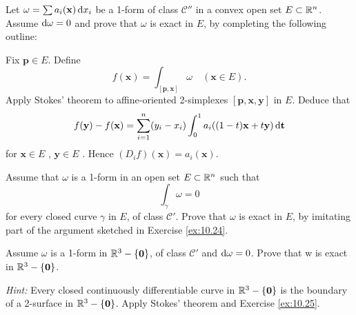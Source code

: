 \begin{myexercise}
    \label{ex:10.24}
    Let $\omega = \sum a_i(\mathbf{x}) \d x_i$ be a 1-form of class $\mathscr{C}''$ in a convex open set $E \subset {\protect\mathbb R}^n$.
    Assume $\d \omega = 0$ and prove that $\omega$ is exact in $E$, by completing the following outline:

    Fix $\mathbf{p} \in E$. 
    Define 
    \begin{equation*}
        f(\mathbf{x}) = \int_{[\mathbf{p,x}]} \omega 
        \quad 
        (\mathbf{x} \in E).
    \end{equation*}
    Apply Stokes' theorem to affine-oriented 2-simplexes $[\mathbf{p, x, y}]$ in $E$. 
    Deduce that
    \begin{equation*}
        f(\mathbf{y}) -
        f(\mathbf{x}) =
        \sum_{i=1}^{n} (y_i-x_i)
        \int_{0}^{1} a_i ((1-t)\mathbf{x}+t\mathbf{y}) \d \mathbf{t}
    \end{equation*}
    for 
    $\mathbf{x} \in E$ ,
    $\mathbf{y} \in E$ .
    Hence $(D_i f)(\mathbf{x}) = a_i(\mathbf{x})$.
\end{myexercise}


\begin{myexercise}    
    \label{ex:10.25}
    Assume that $\omega$ is a 1-form in an open set $E \subset {\protect\mathbb R}^n$ such that
    \begin{equation*}
        \int_{\gamma} \omega = 0
    \end{equation*}
    for every closed curve $\gamma$ in $E$, of class $\mathscr{C}'$. 
    Prove that $\omega$ is exact in $E$, by imitating part of the argument sketched in Exercise \ref{ex:10.24}.
\end{myexercise}


\begin{myexercise}    
    \label{ex:10.26}
    Assume $\omega$ is a 1-form in ${\protect\mathbb R}^3-\{\mathbf{0}\}$, of class $\mathscr{C}'$ and $\d \omega =0$. 
    Prove that w is exact in ${\protect\mathbb R}^3-\{\mathbf{0}\}$.

    \emph{Hint:} Every closed continuously differentiable curve in ${\protect\mathbb R}^3-\{\mathbf{0}\}$ is the boundary of a 2-surface in ${\protect\mathbb R}^3-\{\mathbf{0}\}$. 
    Apply Stokes' theorem and Exercise \ref{ex:10.25}.
\end{myexercise}



